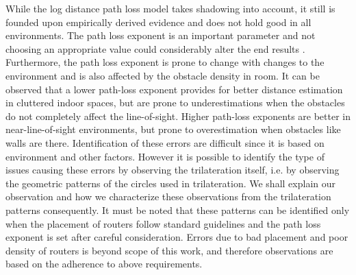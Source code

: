 
While the log distance path loss model takes shadowing into account, it still is founded upon empirically derived evidence and does not hold good in all environments. The path loss exponent is an important parameter and not choosing an appropriate value could considerably alter the end results \cite{srinivasa2009path}. Furthermore, the path loss exponent is prone to change with changes to the environment and is also affected by the obstacle density in room.
It can be observed that a lower path-loss exponent provides for better distance estimation in cluttered indoor spaces, but are prone to underestimations when the obstacles do not completely affect the line-of-sight. Higher path-loss exponents are better in near-line-of-sight environments, but prone to overestimation when obstacles like walls are there. 
Identification of these errors are difficult since it is based on environment and other factors. However it is possible to identify the type of issues causing these errors by observing the trilateration itself, i.e. by observing the geometric patterns of the circles used in trilateration. 
We shall explain our observation and how we characterize these observations from the trilateration patterns consequently.  It must be noted that these patterns can be identified only when the placement of routers follow standard guidelines and the path loss exponent is set after careful consideration. Errors due to bad placement and poor density of routers is beyond scope of this work, and therefore observations are based on the adherence to above requirements.

